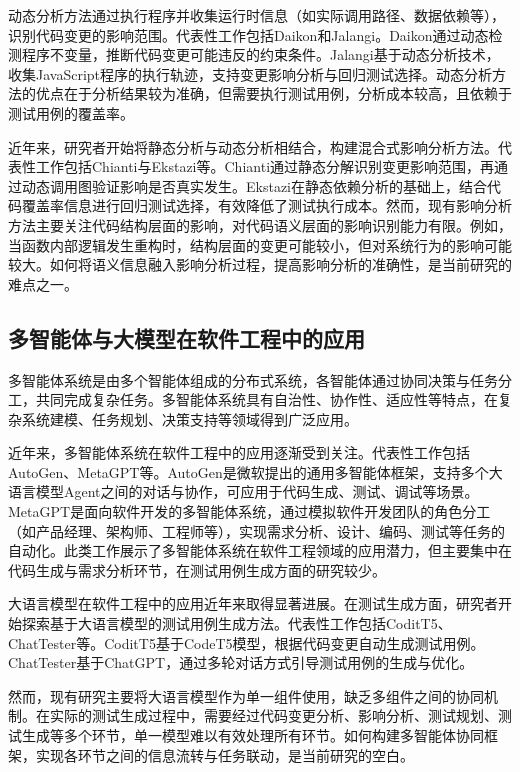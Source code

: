 动态分析方法通过执行程序并收集运行时信息（如实际调用路径、数据依赖等），识别代码变更的影响范围。代表性工作包括Daikon\cite{Ernst2001Daikon}和Jalangi\cite{Sen2015}。Daikon通过动态检测程序不变量，推断代码变更可能违反的约束条件。Jalangi基于动态分析技术，收集JavaScript程序的执行轨迹，支持变更影响分析与回归测试选择。动态分析方法的优点在于分析结果较为准确，但需要执行测试用例，分析成本较高，且依赖于测试用例的覆盖率。

近年来，研究者开始将静态分析与动态分析相结合，构建混合式影响分析方法。代表性工作包括Chianti与Ekstazi等\cite{Ren2004,Gligoric2015Ekstazi,zhouxiaoli2021rts}。Chianti通过静态分解识别变更影响范围，再通过动态调用图验证影响是否真实发生。Ekstazi在静态依赖分析的基础上，结合代码覆盖率信息进行回归测试选择，有效降低了测试执行成本。然而，现有影响分析方法主要关注代码结构层面的影响，对代码语义层面的影响识别能力有限。例如，当函数内部逻辑发生重构时，结构层面的变更可能较小，但对系统行为的影响可能较大。如何将语义信息融入影响分析过程，提高影响分析的准确性，是当前研究的难点之一。

\subsection{多智能体与大模型在软件工程中的应用}
多智能体系统是由多个智能体组成的分布式系统，各智能体通过协同决策与任务分工，共同完成复杂任务。多智能体系统具有自治性、协作性、适应性等特点，在复杂系统建模、任务规划、决策支持等领域得到广泛应用。

近年来，多智能体系统在软件工程中的应用逐渐受到关注。代表性工作包括AutoGen、MetaGPT等\cite{Wu2023AutoGen,Hong2023MetaGPT}。AutoGen是微软提出的通用多智能体框架，支持多个大语言模型Agent之间的对话与协作，可应用于代码生成、测试、调试等场景。MetaGPT是面向软件开发的多智能体系统，通过模拟软件开发团队的角色分工（如产品经理、架构师、工程师等），实现需求分析、设计、编码、测试等任务的自动化。此类工作展示了多智能体系统在软件工程领域的应用潜力，但主要集中在代码生成与需求分析环节，在测试用例生成方面的研究较少。

大语言模型在软件工程中的应用近年来取得显著进展。在测试生成方面，研究者开始探索基于大语言模型的测试用例生成方法。代表性工作包括CoditT5、ChatTester等\cite{Zhang2022CoditT5,luojiale2025llm}。CoditT5基于CodeT5模型，根据代码变更自动生成测试用例。ChatTester基于ChatGPT，通过多轮对话方式引导测试用例的生成与优化。

然而，现有研究主要将大语言模型作为单一组件使用，缺乏多组件之间的协同机制。在实际的测试生成过程中，需要经过代码变更分析、影响分析、测试规划、测试生成等多个环节，单一模型难以有效处理所有环节。如何构建多智能体协同框架，实现各环节之间的信息流转与任务联动，是当前研究的空白。

